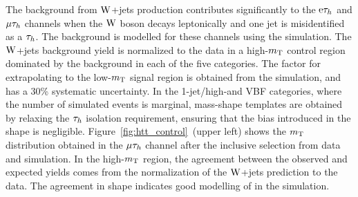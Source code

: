 \documentclass[11pt,twoside,a4paper,cmspaper,final,collab]{cms-tdr}
\begin{document}
The background from $\mathrm{W}$+jets production contributes significantly to the $\mathrm{e}\tau_h$ and ${\mu}\tau_h$ channels when the
$\mathrm{W}$ boson decays leptonically and one jet is misidentified as a $\tau_h$.
The background is modelled for these channels using the simulation.
The $\mathrm{W}$+jets background yield is normalized to the data in a high-$m_\mathrm{T}$
control region dominated by the background in each of the five categories.
The factor for extrapolating to the low-$m_\mathrm{T}$ signal region is obtained from the simulation,
and has a 30\% systematic uncertainty.
In the 1-jet/high-\pt and VBF categories, where the number of simulated events is marginal,
mass-shape templates are obtained by relaxing the $\tau_h$ isolation requirement,
ensuring that the bias introduced in the shape is negligible.
Figure~\ref{fig:htt_control}~(upper left) shows the $m_\mathrm{T}$ distribution obtained in the ${\mu}\tau_h$ channel after the inclusive selection from data and simulation.
In the high-$m_\mathrm{T}$ region, the agreement between the observed and expected yields comes from the normalization of the $\mathrm{W}$+jets prediction to the data.
The agreement in shape indicates good modelling of \MET in the simulation.
\end{document}
